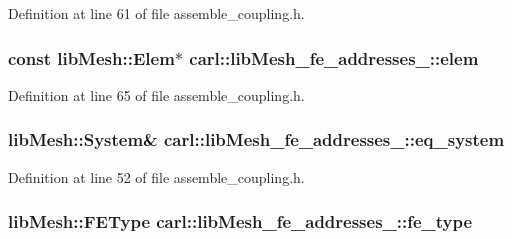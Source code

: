 Definition at line 61 of file assemble\+\_\+coupling.\+h.

\hypertarget{classcarl_1_1lib_mesh__fe__addresses__3_ae605a2361e42cf2dd2ef8103143060b1}{}
\subsubsection[{elem}]{\setlength{\rightskip}{0pt plus 5cm}const lib\+Mesh\+::\+Elem$\ast$ carl\+::lib\+Mesh\+\_\+fe\+\_\+addresses\+\_\+::elem}\label{classcarl_1_1lib_mesh__fe__addresses__3_ae605a2361e42cf2dd2ef8103143060b1}


Definition at line 65 of file assemble\+\_\+coupling.\+h.

\hypertarget{classcarl_1_1lib_mesh__fe__addresses__3_a00a369a85085d3ea80f41a80f9240cd2}{}
\subsubsection[{eq\+\_\+system}]{\setlength{\rightskip}{0pt plus 5cm}lib\+Mesh\+::\+System\& carl\+::lib\+Mesh\+\_\+fe\+\_\+addresses\+\_\+::eq\+\_\+system}\label{classcarl_1_1lib_mesh__fe__addresses__3_a00a369a85085d3ea80f41a80f9240cd2}


Definition at line 52 of file assemble\+\_\+coupling.\+h.

\hypertarget{classcarl_1_1lib_mesh__fe__addresses__3_a1e846af08149d7e65adad645e402d086}{}
\subsubsection[{fe\+\_\+type}]{\setlength{\rightskip}{0pt plus 5cm}lib\+Mesh\+::\+F\+E\+Type carl\+::lib\+Mesh\+\_\+fe\+\_\+addresses\+\_\+::fe\+\_\+type}\label{classcarl_1_1lib_mesh__fe__addresses__3_a1e846af08149d7e65adad645e402d086}


